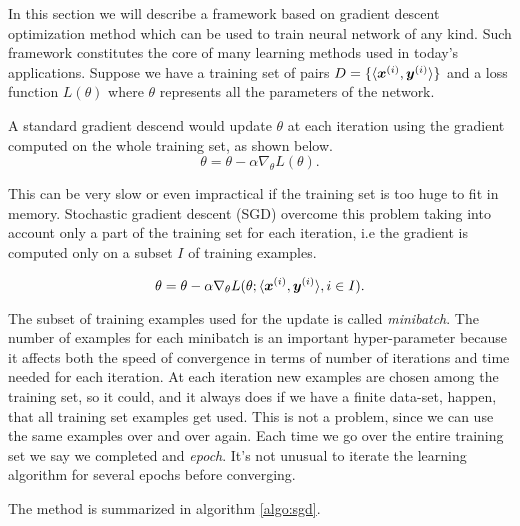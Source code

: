\label{sec:sgd}
In this section we will describe a framework based on gradient descent optimization method which can be used to train 
neural network of any kind. Such framework constitutes the core of many learning methods used in today's applications. 
Suppose we have a training set of pairs $D=\{\langle\boldsymbol{x}^{(i)},\boldsymbol{y}^{(i)}\rangle\}$ and a loss function $L(\theta)$ 
where $\theta$ represents all the parameters of the network.

A standard gradient descend would update $\theta$ at each iteration using the gradient computed on the whole training 
set, as shown below.
\begin{equation}
 \theta = \theta - \alpha \nabla_\theta L(\theta).
\end{equation}

This can be very slow or even impractical if the training set is too huge to fit in memory. Stochastic gradient descent (SGD)
overcome this problem taking into account only a part of the training set for each iteration, i.e the gradient is 
computed only on a subset $I$ of training examples. 

\begin{equation}
 \theta = \theta - \alpha \nabla_\theta L(\theta; \langle\boldsymbol{x}^{(i)},\boldsymbol{y}^{(i)}\rangle, i\in I)
 \label{eq:updateRule}.
\end{equation}

The subset of training examples used for the update is called \textit{minibatch}. The number of examples for each 
minibatch is an important hyper-parameter because it affects both the speed of convergence in terms of number of 
iterations and time needed for each iteration. At each iteration new examples are chosen among the training set, so it could, and it always does if we have a finite data-set, happen, that all training set examples get used.
This is not a problem, since we can use the same examples over and over again. Each time we go over the entire training 
set we say we completed and \textit{epoch}. It's not unusual to iterate the learning algorithm for several epochs 
before converging.

The method is summarized in algorithm \ref{algo:sgd}.

